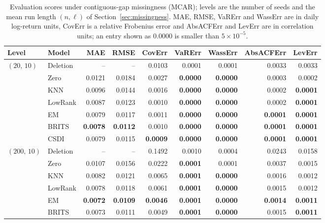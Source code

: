 \begin{table}[p]
  \centering
  \footnotesize
  \caption[Evaluation scores under contiguous-gap missingness]{Evaluation scores under contiguous-gap missingness (MCAR); levels are the number of seeds and the mean run length $(n, \ell)$ of Section~\ref{sec:missingness}. MAE, RMSE, VaRErr and WassErr are in daily log-return units, CovErr is a relative Frobenius error and AbsACFErr and LevErr are in correlation units; an entry shown as $0.0000$ is smaller than $5\times 10^{-5}$.}
  \label{tab:results_gaps}
  \begin{tabular}{llrrrrrrr}
    \toprule
    Level & Model & MAE & RMSE & CovErr & VaRErr & WassErr & AbsACFErr & LevErr \\
    \midrule
    $(20,\, 10)$ & Deletion & -- & -- & 0.0103 & 0.0001 & 0.0001 & 0.0033 & 0.0033 \\
     & Zero & 0.0121 & 0.0184 & 0.0027 & \textbf{0.0000} & \textbf{0.0000} & 0.0003 & 0.0002 \\
     & KNN & 0.0096 & 0.0144 & 0.0016 & \textbf{0.0000} & \textbf{0.0000} & 0.0002 & \textbf{0.0001} \\
     & LowRank & 0.0087 & 0.0123 & 0.0010 & \textbf{0.0000} & \textbf{0.0000} & 0.0002 & \textbf{0.0001} \\
     & EM & 0.0079 & 0.0117 & 0.0011 & \textbf{0.0000} & \textbf{0.0000} & \textbf{0.0001} & \textbf{0.0001} \\
     & BRITS & \textbf{0.0078} & \textbf{0.0112} & 0.0010 & \textbf{0.0000} & \textbf{0.0000} & \textbf{0.0001} & \textbf{0.0001} \\
     & CSDI & 0.0079 & 0.0115 & \textbf{0.0009} & \textbf{0.0000} & \textbf{0.0000} & \textbf{0.0001} & \textbf{0.0001} \\
    \midrule
    $(200,\, 10)$ & Deletion & -- & -- & 0.1492 & 0.0010 & 0.0004 & 0.0243 & 0.0158 \\
     & Zero & 0.0107 & 0.0156 & 0.0222 & \textbf{0.0001} & 0.0001 & 0.0037 & 0.0015 \\
     & KNN & 0.0082 & 0.0121 & 0.0065 & \textbf{0.0001} & \textbf{0.0000} & 0.0016 & 0.0012 \\
     & LowRank & 0.0078 & 0.0118 & 0.0061 & \textbf{0.0001} & \textbf{0.0000} & 0.0015 & 0.0012 \\
     & EM & \textbf{0.0072} & \textbf{0.0109} & \textbf{0.0046} & \textbf{0.0001} & \textbf{0.0000} & \textbf{0.0014} & \textbf{0.0011} \\
     & BRITS & 0.0073 & 0.0111 & 0.0049 & \textbf{0.0001} & \textbf{0.0000} & 0.0015 & \textbf{0.0011} \\

\end{tabular}
\end{table}
